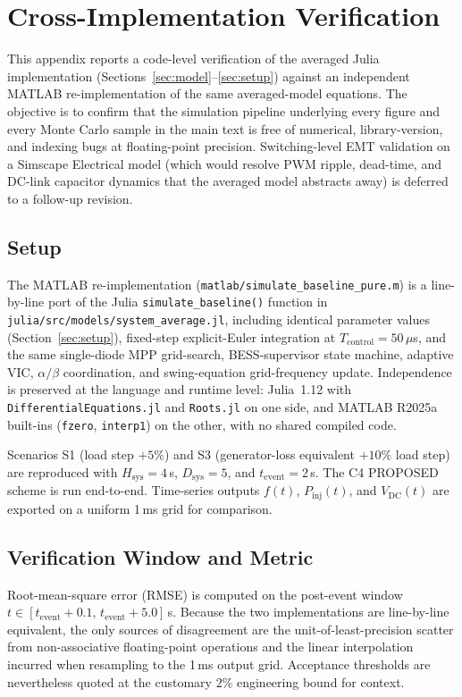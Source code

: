 
\section{Cross-Implementation Verification}\label{sec:appendix-simulink}

This appendix reports a code-level verification of the averaged Julia
implementation (Sections~\ref{sec:model}--\ref{sec:setup}) against an
independent MATLAB re-implementation of the same averaged-model
equations. The objective is to confirm that the simulation pipeline
underlying every figure and every Monte Carlo sample in the main text
is free of numerical, library-version, and indexing bugs at
floating-point precision. Switching-level EMT validation on a Simscape
Electrical model (which would resolve PWM ripple, dead-time, and
DC-link capacitor dynamics that the averaged model abstracts away) is
deferred to a follow-up revision.

\subsection{Setup}
The MATLAB re-implementation (\texttt{matlab/simulate\_baseline\_pure.m})
is a line-by-line port of the Julia
\texttt{simulate\_baseline()} function in
\texttt{julia/src/models/system\_average.jl}, including identical
parameter values (Section~\ref{sec:setup}),
fixed-step explicit-Euler integration at $T_\mathrm{control}=50\,\mu$s,
and the same single-diode MPP grid-search, BESS-supervisor
state machine, adaptive VIC, $\alpha/\beta$ coordination, and
swing-equation grid-frequency update. Independence is preserved at
the language and runtime level: Julia~1.12 with
\texttt{DifferentialEquations.jl} and \texttt{Roots.jl} on one side, and
MATLAB R2025a built-ins (\texttt{fzero}, \texttt{interp1}) on the
other, with no shared compiled code.

Scenarios S1 (load step $+5\%$) and S3 (generator-loss equivalent
$+10\%$ load step) are reproduced with $H_\mathrm{sys}=4\,$s,
$D_\mathrm{sys}=5$, and $t_\mathrm{event}=2\,$s. The C4 PROPOSED scheme
is run end-to-end. Time-series outputs $f(t)$, $P_\mathrm{inj}(t)$, and
$V_\mathrm{DC}(t)$ are exported on a uniform 1\,ms grid for comparison.

\subsection{Verification Window and Metric}
Root-mean-square error (RMSE) is computed on the post-event window
$t\in[t_\mathrm{event}+0.1,\,t_\mathrm{event}+5.0]\,$s. Because the two
implementations are line-by-line equivalent, the only sources of
disagreement are the unit-of-least-precision scatter from non-associative
floating-point operations and the linear interpolation incurred when
resampling to the 1\,ms output grid. Acceptance thresholds are
nevertheless quoted at the customary $2\%$ engineering bound for
context.

